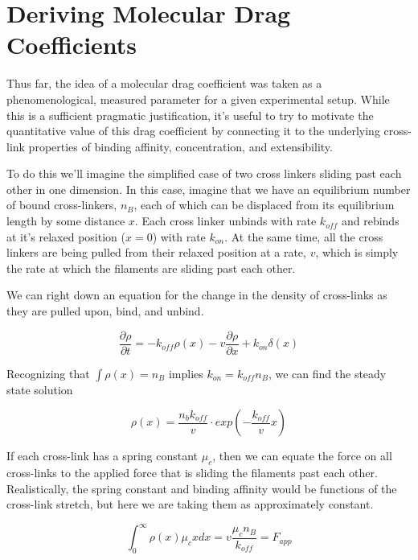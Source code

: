 \documentclass[pre,preprint]{revtex4-1}
\begin{document}
\appendix
\addappheadtotoc

\section{Deriving Molecular Drag Coefficients}
\label{app_drag}
Thus far, the idea of a molecular drag coefficient was taken as a phenomenological, measured parameter for a given experimental setup.  While this is a sufficient pragmatic justification, it's useful to try to motivate the quantitative value of this drag coefficient by connecting it to the underlying cross-link properties of binding affinity, concentration, and extensibility.

To do this we'll imagine the simplified case of two cross linkers sliding past each other in one dimension.  In this case, imagine that we have an equilibrium number of bound cross-linkers, $n_B$, each of which can be displaced from its equilibrium length by some distance $x$.  Each cross linker unbinds with rate $k_{off}$ and rebinds at it's relaxed position ($x=0$) with rate $k_{on}$.  At the same time, all the cross linkers are being pulled from their relaxed position at a rate, $v$, which is simply the rate at which the filaments are sliding past each other.  

We can right down an equation for the change in the density of cross-links as they are pulled upon, bind, and unbind.

\begin{equation}
\frac{\partial \rho}{\partial t} = -k_{off}\rho(x) - v\frac{\partial \rho}{\partial x} + k_{on}\delta(x)
\end{equation}

Recognizing that $\int \rho(x)=n_B$ implies $k_{on}=k_{off}n_B$, we can find the steady state solution

\begin{equation}
\rho(x) = \frac{n_b k_{off}}{v}\cdot exp\left ( -\frac{k_{off}}{v}x \right )
\end{equation}

If each cross-link has a spring constant $\mu_c$, then we can equate the force on all cross-links to the applied force that is sliding the filaments past each other.  Realistically, the spring constant and binding affinity would be functions of the cross-link stretch, but here we are taking them as approximately constant.  

\begin{equation}
\int_{0}^{\infty}\rho(x)\mu_cx dx = v \frac{\mu_c n_B}{k_{off}}= F_{app}
\end{equation}
\end{document}
